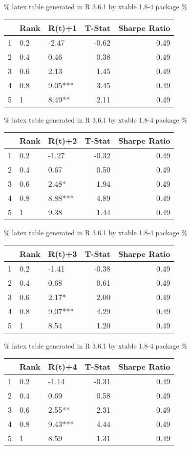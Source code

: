\documentclass[
]{article}
\begin{document}
\% latex table generated in R 3.6.1 by xtable 1.8-4 package \%

\begin{tabular}{rllrr}
  \hline
 & Rank & R(t)+1 & T-Stat & Sharpe Ratio \\ 
  \hline
1 & 0.2 & -2.47 & -0.62 & 0.49 \\ 
  2 & 0.4 & 0.46 & 0.38 & 0.49 \\ 
  3 & 0.6 & 2.13 & 1.45 & 0.49 \\ 
  4 & 0.8 & 9.05*** & 3.45 & 0.49 \\ 
  5 & 1 & 8.49** & 2.11 & 0.49 \\ 
   \hline
\end{tabular}

\% latex table generated in R 3.6.1 by xtable 1.8-4 package \%

\begin{tabular}{rllrr}
  \hline
 & Rank & R(t)+2 & T-Stat & Sharpe Ratio \\ 
  \hline
1 & 0.2 & -1.27 & -0.32 & 0.49 \\ 
  2 & 0.4 & 0.67 & 0.50 & 0.49 \\ 
  3 & 0.6 & 2.48* & 1.94 & 0.49 \\ 
  4 & 0.8 & 8.88*** & 4.89 & 0.49 \\ 
  5 & 1 & 9.38 & 1.44 & 0.49 \\ 
   \hline
\end{tabular}

\% latex table generated in R 3.6.1 by xtable 1.8-4 package \%

\begin{tabular}{rllrr}
  \hline
 & Rank & R(t)+3 & T-Stat & Sharpe Ratio \\ 
  \hline
1 & 0.2 & -1.41 & -0.38 & 0.49 \\ 
  2 & 0.4 & 0.68 & 0.61 & 0.49 \\ 
  3 & 0.6 & 2.17* & 2.00 & 0.49 \\ 
  4 & 0.8 & 9.07*** & 4.29 & 0.49 \\ 
  5 & 1 & 8.54 & 1.20 & 0.49 \\ 
   \hline
\end{tabular}

\% latex table generated in R 3.6.1 by xtable 1.8-4 package \%

\begin{tabular}{rllrr}
  \hline
 & Rank & R(t)+4 & T-Stat & Sharpe Ratio \\ 
  \hline
1 & 0.2 & -1.14 & -0.31 & 0.49 \\ 
  2 & 0.4 & 0.69 & 0.58 & 0.49 \\ 
  3 & 0.6 & 2.55** & 2.31 & 0.49 \\ 
  4 & 0.8 & 9.43*** & 4.44 & 0.49 \\ 
  5 & 1 & 8.59 & 1.31 & 0.49 \\ 
   \hline
\end{tabular}
\end{document}
